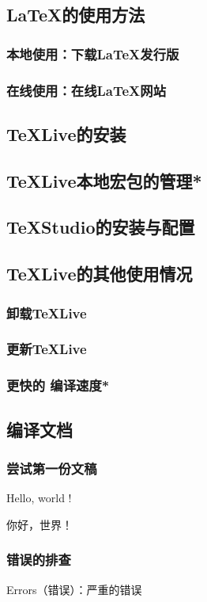 \documentclass[twoside]{ctexart}
\begin{document}
    \subsection{\LaTeX 的使用方法}
        \subsubsection{本地使用：下载\LaTeX 发行版}
        \subsubsection{在线使用：在线\LaTeX 网站}
    \subsection{\TeX Live的安装}
    \subsection{\TeX Live本地宏包的管理*}
    \subsection{\TeX Studio的安装与配置}
    \subsection{\TeX Live的其他使用情况}
        \subsubsection{卸载\TeX Live}
        \subsubsection{更新\TeX Live}
        \subsubsection{更快的 编译速度*}
    \subsection{编译文档}
	    \subsubsection{尝试第一份文稿}
		    Hello, world ! 

		    你好，世界！

	    \subsubsection{错误的排查}
            Errors（错误）：严重的错误
\end{document}
